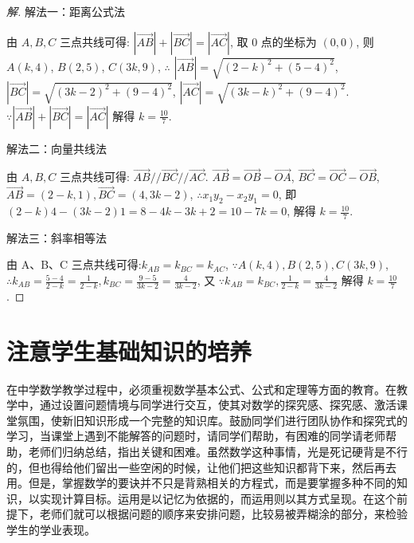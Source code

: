 \begin{proof}[解]
  解法一：距离公式法 \par
  由 $A , B ,C$ 三点共线可得: $|\overrightarrow{AB}|+|\overrightarrow{B C}|=|\overrightarrow{AC}|$, 取 0 点的坐标为 $(0,0)$,
  则 $A(k, 4)$, $B(2,5)$, $C(3 k, 9)$, $\therefore$
  $|\overrightarrow{AB}|=\sqrt{(2-k)^{2}+(5-4)^{2}}$, 
  $|\overrightarrow{B C}|=\sqrt{(3 k-2)^{2}+(9-4)^{2}}$, 
  $|\overrightarrow{AC}|=\sqrt{(3 k-k)^{2}+(9-4)^{2}} $.
  $\because|\overrightarrow{AB}|+|\overrightarrow{B C}|=|\overrightarrow{AC}|$ 解得 $k=\frac{10}{7}$.

  解法二：向量共线法 \par
  由 $A, B , C$ 三点共线可得: $\overrightarrow{AB} / / \overrightarrow{B C} / / \overrightarrow{A C}$.
  $\overrightarrow{A B}=\overrightarrow{O B}-\overrightarrow{O A}$,
  $\overrightarrow{B C}=\overrightarrow{O C}-\overrightarrow{O B}$,
  ${\overrightarrow{AB}}=(2-{k}, 1), \overrightarrow{B C}=(4,3 {k}-2)$,
  $\therefore x_{1} y_{2}-x_{2} y_{1}=0$, 即 $(2-k) 4-(3 k-2) 1=8-4 k-3 k+2=10-7 k=0$, 解得 $k=\frac{10}{7}$.
  
  解法三：斜率相等法 \par
  由 A、B、C 三点共线可得:$k_{A B}=k_{B C}=k_{A C}$,
  $\because A({k}, 4), {B}(2,5), {C}(3 {k}, 9)$,
  $\therefore k_{A B}=\frac{5-4}{2-k}=\frac{1}{2-k}, k_{B C}=\frac{9-5}{3 k-2}=\frac{4}{3 k-2}$,
  又 $\because k_{A B}=k_{B C}, \frac{1}{2-k}=\frac{4}{3 k-2}$ 解得 ${k}=\frac{10}{7}$.
\end{proof}



\section{注意学生基础知识的培养}

在中学数学教学过程中，必须重视数学基本公式、公式和定理等方面的教育。在教学中，通过设置问题情境与同学进行交互，使其对数学的探究感、探究感、激活课堂氛围，使新旧知识形成一个完整的知识库。鼓励同学们进行团队协作和探究式的学习，当课堂上遇到不能解答的问题时，请同学们帮助，有困难的同学请老师帮助，老师们归纳总结，指出关键和困难。虽然数学这种事情，光是死记硬背是不行的，但也得给他们留出一些空闲的时候，让他们把这些知识都背下来，然后再去用。但是，掌握数学的要诀并不只是背熟相关的方程式，而是要掌握多种不同的知识，以实现计算目标。运用是以记忆为依据的，而运用则以其方式呈现。在这个前提下，老师们就可以根据问题的顺序来安排问题，比较易被弄糊涂的部分，来检验学生的学业表现。


